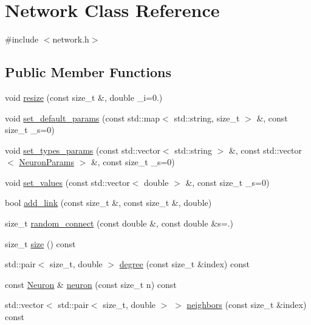 \hypertarget{classNetwork}{}\section{Network Class Reference}
\label{classNetwork}


{\ttfamily \#include $<$network.\+h$>$}

\subsection*{Public Member Functions}
\begin{DoxyCompactItemize}
\item 
void \hyperlink{classNetwork_ad91ae24f308dd2b46ff76396fcdb9765}{resize} (const size\+\_\+t \&, double \+\_\+i=0.)
\item 
void \hyperlink{classNetwork_ad1d20020028425cfab199da1942172c9}{set\+\_\+default\+\_\+params} (const std\+::map$<$ std\+::string, size\+\_\+t $>$ \&, const size\+\_\+t \+\_\+s=0)
\item 
void \hyperlink{classNetwork_a40daf6578a6146f4c339f0efffd5070d}{set\+\_\+types\+\_\+params} (const std\+::vector$<$ std\+::string $>$ \&, const std\+::vector$<$ \hyperlink{structNeuronParams}{Neuron\+Params} $>$ \&, const size\+\_\+t \+\_\+s=0)
\item 
void \hyperlink{classNetwork_a699416a6462f2da6a5f6cddb30f31440}{set\+\_\+values} (const std\+::vector$<$ double $>$ \&, const size\+\_\+t \+\_\+s=0)
\item 
bool \hyperlink{classNetwork_a6ebe0899329973e4924997a25e205856}{add\+\_\+link} (const size\+\_\+t \&, const size\+\_\+t \&, double)
\item 
size\+\_\+t \hyperlink{classNetwork_a681d8f731ce258376a20f9bf062b943b}{random\+\_\+connect} (const double \&, const double \&s=.)
\item 
size\+\_\+t \hyperlink{classNetwork_a41c54d12d861883170b5c5abca3a7bc8}{size} () const
\item 
std\+::pair$<$ size\+\_\+t, double $>$ \hyperlink{classNetwork_a06de035ba134c5aed590bd5f9f8035d1}{degree} (const size\+\_\+t \&index) const
\item 
const \hyperlink{classNeuron}{Neuron} \& \hyperlink{classNetwork_a4639c4fd24bc6dc807ae35af6577ed7f}{neuron} (const size\+\_\+t n) const
\item 
std\+::vector$<$ std\+::pair$<$ size\+\_\+t, double $>$ $>$ \hyperlink{classNetwork_abf7324fe99e691cb9b06247e5e5013fd}{neighbors} (const size\+\_\+t \&index) const

\end{DoxyCompactItemize}
